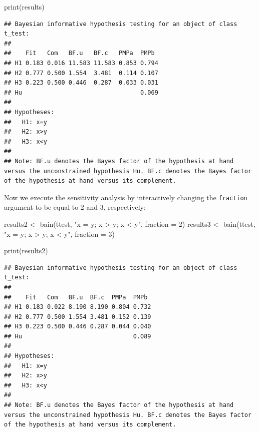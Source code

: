 \documentclass[
]{book}
\newenvironment{Shaded}{\begin{snugshade}}{\end{snugshade}}
\newcommand{\AttributeTok}[1]{\textcolor[rgb]{0.77,0.63,0.00}{#1}}
\newcommand{\DecValTok}[1]{\textcolor[rgb]{0.00,0.00,0.81}{#1}}
\newcommand{\FunctionTok}[1]{\textcolor[rgb]{0.00,0.00,0.00}{#1}}
\newcommand{\NormalTok}[1]{#1}
\newcommand{\OtherTok}[1]{\textcolor[rgb]{0.56,0.35,0.01}{#1}}
\newcommand{\StringTok}[1]{\textcolor[rgb]{0.31,0.60,0.02}{#1}}
\begin{document}
\begin{Shaded}
\begin{Highlighting}[]
\FunctionTok{print}\NormalTok{(results)}
\end{Highlighting}
\end{Shaded}

\begin{verbatim}
## Bayesian informative hypothesis testing for an object of class t_test:
## 
##    Fit   Com   BF.u   BF.c   PMPa  PMPb 
## H1 0.183 0.016 11.583 11.583 0.853 0.794
## H2 0.777 0.500 1.554  3.481  0.114 0.107
## H3 0.223 0.500 0.446  0.287  0.033 0.031
## Hu                                 0.069
## 
## Hypotheses:
##   H1: x=y
##   H2: x>y
##   H3: x<y
## 
## Note: BF.u denotes the Bayes factor of the hypothesis at hand versus the unconstrained hypothesis Hu. BF.c denotes the Bayes factor of the hypothesis at hand versus its complement.
\end{verbatim}

Now we execute the sensitivity analysis by interactively changing the \texttt{fraction} argument to be equal to 2 and 3, respectively:

\begin{Shaded}
\begin{Highlighting}[]
\NormalTok{results2 }\OtherTok{\textless{}{-}} \FunctionTok{bain}\NormalTok{(ttest, }\StringTok{"x = y; x \textgreater{} y; x \textless{} y"}\NormalTok{, }\AttributeTok{fraction =} \DecValTok{2}\NormalTok{)}
\NormalTok{results3 }\OtherTok{\textless{}{-}} \FunctionTok{bain}\NormalTok{(ttest, }\StringTok{"x = y; x \textgreater{} y; x \textless{} y"}\NormalTok{, }\AttributeTok{fraction =} \DecValTok{3}\NormalTok{)}
\end{Highlighting}
\end{Shaded}

\begin{Shaded}
\begin{Highlighting}[]
\FunctionTok{print}\NormalTok{(results2)}
\end{Highlighting}
\end{Shaded}

\begin{verbatim}
## Bayesian informative hypothesis testing for an object of class t_test:
## 
##    Fit   Com   BF.u  BF.c  PMPa  PMPb 
## H1 0.183 0.022 8.190 8.190 0.804 0.732
## H2 0.777 0.500 1.554 3.481 0.152 0.139
## H3 0.223 0.500 0.446 0.287 0.044 0.040
## Hu                               0.089
## 
## Hypotheses:
##   H1: x=y
##   H2: x>y
##   H3: x<y
## 
## Note: BF.u denotes the Bayes factor of the hypothesis at hand versus the unconstrained hypothesis Hu. BF.c denotes the Bayes factor of the hypothesis at hand versus its complement.
\end{verbatim}
\end{document}

